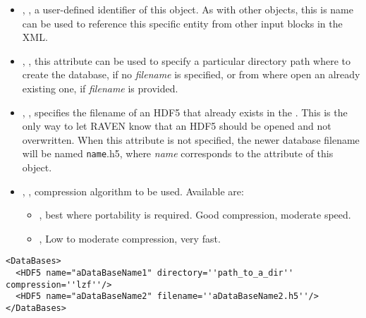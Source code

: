 \begin{itemize}
  \itemsep0em
  \item {}, , a user-defined
  identifier of this object.
  \nb As with other objects, this is name can be used to reference this specific
  entity from other input blocks in the XML.
  \item {}, , this attribute
  can be used to specify a particular directory path where to create the
  database, if no \textit{filename} is specified, or from where open an already
  existing one, if \textit{filename} is provided. 
  \item {}, , specifies the
  filename of an HDF5 that already exists in the .
  This is the only way to let RAVEN know that an HDF5 should be opened and not
  overwritten.
  \nb When this attribute is not specified, the newer database filename will be
  named \texttt{name}.h5, where \textit{name} corresponds to the 
  attribute of this object.
  \item {}, , compression
  algorithm to be used.
  Available are:
  \begin{itemize}
    \item {}, best where portability is required.
    Good compression, moderate speed.
    \item {}, Low to moderate compression, very fast.
  \end{itemize}
\end{itemize}

\begin{lstlisting}[style=XML,morekeywords={directory,filename}]
<DataBases>
  <HDF5 name="aDataBaseName1" directory=''path_to_a_dir'' compression=''lzf''/>
  <HDF5 name="aDataBaseName2" filename=''aDataBaseName2.h5''/>
</DataBases>
\end{lstlisting}
